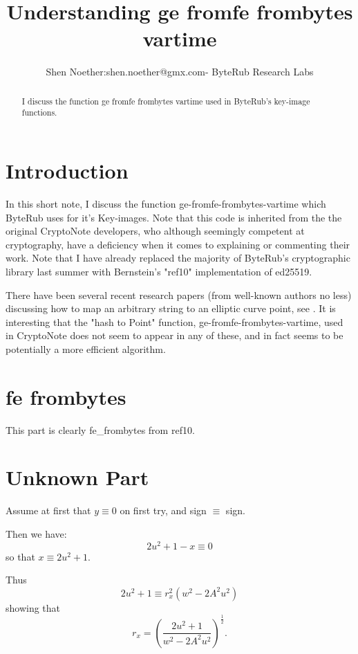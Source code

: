 \documentclass[12pt,oneside,english]{amsart}
\numberwithin{equation}{section}
\numberwithin{figure}{section}
\theoremstyle{plain}
\theoremstyle{plain}
\theoremstyle{remark}
\theoremstyle{plain}
\theoremstyle{remark}
\theoremstyle{remark}
\theoremstyle{plain}
\theoremstyle{definition}
\begin{document}
\lstset{language=C} 


\title{Understanding ge fromfe frombytes vartime}


\author{Shen Noether:shen.noether@gmx.com- ByteRub Research Labs}
\begin{abstract}
I discuss the function ge fromfe frombytes vartime used in ByteRub's key-image functions. 
\end{abstract}

\maketitle

\tableofcontents
\section{Introduction}
In this short note, I discuss the function ge-fromfe-frombytes-vartime which ByteRub uses for it's Key-images. Note that this code is inherited from the the original CryptoNote developers, who although seemingly competent at cryptography, have a deficiency when it comes to explaining or commenting their work. Note that I have already replaced the majority of ByteRub's cryptographic library last summer with Bernstein's "ref10" implementation of ed25519.
\par
There have been several recent research papers (from well-known authors no less) discussing how to map an arbitrary string to an elliptic curve point, see \cite{Tib2010,Tib2013}. It is interesting that the "hash to Point" function, ge-fromfe-frombytes-vartime, used in CryptoNote \cite{CN} does not seem to appear in any of these, and in fact seems to be potentially a more efficient algorithm. 
\section{fe frombytes}
This part is clearly fe\_frombytes from ref10. 
\section{Unknown Part}
Assume at first that $y\equiv 0$ on first try, and sign $\equiv $ sign. 

\par

Then we have: 
\[
2u^2 + 1 - x \equiv 0
\]
so that $x\equiv 2u^2 + 1$. 

Thus 
\[
2u^2 + 1 \equiv r_x^2 (w^2 - 2A^2 u^2)
\]
showing that 
\[
r_x = \left(\frac{2u^2 + 1}{w^2 - 2A^2 u^2}\right)^{\frac{1}{2}}.
\]
\end{document}
